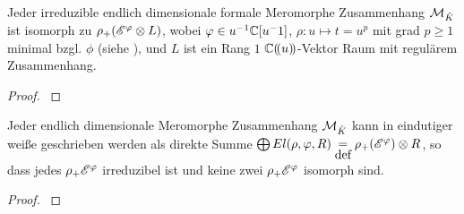 

\begin{prop}
\cite[Prop 3.1]{sabbah_Fourier-local}
Jeder irreduzible endlich dimensionale formale Meromorphe Zusammenhang
$\mathcal{M}_{\hat K}$ ist isomorph zu $\rho_+(\mathscr{E}^\varphi\otimes L)$, wobei $\varphi\in
u^{-1}\mathbb{C}[u^-1]$, $\rho:u\mapsto t=u^p$ mit grad $p\geq1$ minimal bzgl. $\phi$
(siehe \cite[Rem 2.8]{sabbah_Fourier-local}), und $L$ ist ein Rang $1$
${\mathbb C (\!(u)\!)}$-Vektor Raum mit regulärem Zusammenhang.
\end{prop}
\begin{proof}
\cite[Prop 3.1]{sabbah_Fourier-local}
\end{proof}

\begin{thm}
\cite[Cor 3.3]{sabbah_Fourier-local}
Jeder endlich dimensionale Meromorphe Zusammenhang $\mathcal{M}_{\hat K}$ kann in
eindutiger weiße geschrieben werden als direkte Summe $\bigoplus
El(\rho,\varphi,R)\underset{\mbox{def}}{=}\rho_+(\mathscr{E}^\varphi)\otimes R$, so dass
jedes $\rho_+\mathscr{E}^\varphi$ irreduzibel ist und keine zwei $\rho_+\mathscr{E}^\varphi$ isomorph
sind.
\end{thm}
\begin{proof}
\cite[Cor 3.3]{sabbah_Fourier-local}
\end{proof}

